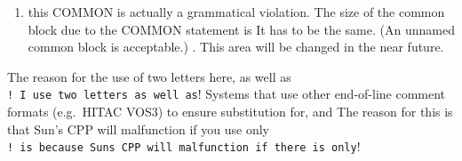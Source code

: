 \begin{enumerate}
\def\labelenumi{\arabic{enumi}.}
\tightlist
\item
  this COMMON is actually a grammatical violation. The size of the
  common block due to the COMMON statement is It has to be the same. (An
  unnamed common block is acceptable.) . This area will be changed in
  the near future.
\end{enumerate}

The reason for the use of two letters here, as well as
\texttt{!\ I\ use\ two\ letters\ as\ well\ as}! Systems that use other
end-of-line comment formats (e.g.~HITAC VOS3) to ensure substitution
for, and The reason for this is that Sun's CPP will malfunction if you
use only
\texttt{!\ is\ because\ Sun\textquotesingle{}s\ CPP\ will\ malfunction\ if\ there\ is\ only}!
